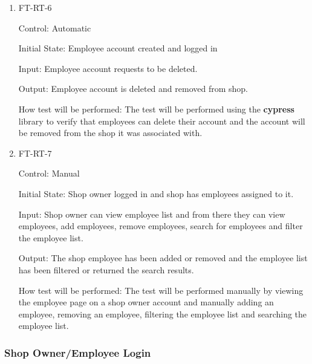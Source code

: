 \documentclass[12pt, titlepage]{article}
\begin{document}
\begin{enumerate}
\item{FT-RT-6\\}

Control: Automatic
					
Initial State: Employee account created and logged in
					
Input: Employee account requests to be deleted.
					
Output: Employee account is deleted and removed from shop.

How test will be performed: The test will be performed using the \textbf{cypress} library to verify that employees can delete their account and the account will be removed from the shop it was associated with.

\item{FT-RT-7\\}

Control: Manual
					
Initial State: Shop owner logged in and shop has employees assigned to it.
					
Input: Shop owner can view employee list and from there they can view employees, add employees, remove employees, search for employees and filter the employee list.
					
Output: The shop employee has been added or removed and the employee list has been filtered or returned the search results.

How test will be performed: The test will be performed manually by viewing the employee page on a shop owner account and manually adding an employee, removing an employee, filtering the employee list and searching the employee list.

\end{enumerate}

\subsubsection{Shop Owner/Employee Login}
\end{document}

